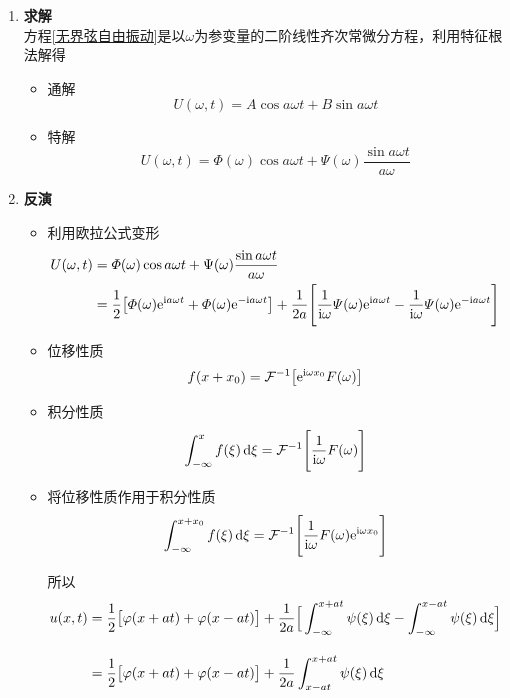 \begin{enumerate}
	\item \textbf{求解}\\
	方程\eqref{无界弦自由振动}是以$\omega$为参变量的二阶线性齐次常微分方程，利用特征根法解得
	\begin{itemize}
		\item 通解
		\begin{equation}
			U(\omega, t) = A\cos a\omega t + B\sin a \omega t
		\end{equation}
		\item 特解
		\begin{equation}
			U(\omega, t) = \varPhi(\omega)\cos a\omega t + \varPsi(\omega) \dfrac{\sin a\omega t}{a \omega}
		\end{equation}
	\end{itemize}
	
	\item \textbf{反演}
	\begin{itemize}
		\item 利用欧拉公式变形
		\begin{align*}
			U(\omega, t) & = \varPhi(\omega)\cos a\omega t + \Psi(\omega)\dfrac{\sin a\omega t}{a \omega} \\
			& = \dfrac{1}{2}\big[\varPhi(\omega) {\rm{e}}^{{\rm{i}} a \omega t} + \varPhi(\omega){\rm{e}}^{- {\rm{i}} a \omega t}\big] + \dfrac{1}{2a} \Bigg[\dfrac{1}{{\rm{i}} \omega}\varPsi(\omega) {\rm{e}}^{{\rm{i}} a \omega t} - \dfrac{1}{{\rm{i}} \omega} \varPsi(\omega) {\rm{e}}^{- {\rm{i}} a\omega t}\Bigg]
		\end{align*}
		\item 位移性质
		\begin{equation}
			f(x + x_0) = \mathcal{F}^{-1} \big[{\rm{e}}^{{\rm{i}} \omega x_0}F(\omega)\big]
		\end{equation}
		
		\item 积分性质
		\begin{equation}
			\int_{-\infty}^x f(\xi) \, {\rm{d}} \xi = \mathcal{F}^{-1} \Bigg[\dfrac{1}{{\rm{i}} \omega}F(\omega)\Bigg]
		\end{equation}
		
		\item 将位移性质作用于积分性质
		\begin{equation}
			\int_{-\infty}^{x + x_0} f(\xi)\, {\rm{d}} \xi = \mathcal{F}^{-1} \Bigg[\dfrac{1}{{\rm{i}} \omega} F(\omega) {\rm{e}}^{{\rm{i}} \omega x_0}\Bigg]
		\end{equation}
		
		所以
		\begin{align}
			u(x, t) &= \dfrac{1}{2} \big[\varphi(x + at) + \varphi(x - at)\big] + \dfrac{1}{2a}\Big[\int_{- \infty}^{x +at}\psi(\xi)\, {\rm{d}} \xi - \int_{-\infty}^{x - at} \psi(\xi) \, {\rm{d}} \xi\Big]\notag \\[1em]
			& = \dfrac{1}{2}\big[\varphi(x + at) + \varphi(x - at)\big] + \dfrac{1}{2a} \int_{x-at}^{x+at}\psi(\xi) \, {\rm{d}} \xi
		\end{align}
	\end{itemize}
\end{enumerate}

